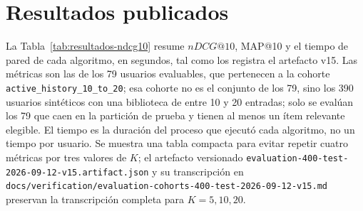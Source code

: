 \section{Resultados publicados}\label{sec:exp-resultados}\label{sec:exp-exito}

La Tabla~\ref{tab:resultados-ndcg10} resume \(nDCG@10\), MAP@10 y el tiempo de pared de cada algoritmo, en segundos, tal como los registra el artefacto v15. Las métricas son las de los 79 usuarios evaluables, que pertenecen a la cohorte \texttt{active\_history\_10\_to\_20}; esa cohorte no es el conjunto de los 79, sino los 390 usuarios sintéticos con una biblioteca de entre 10 y 20 entradas; solo se evalúan los 79 que caen en la partición de prueba y tienen al menos un ítem relevante elegible. El tiempo es la duración del proceso que ejecutó cada algoritmo, no un tiempo por usuario. Se muestra una tabla compacta para evitar repetir cuatro métricas por tres valores de \(K\); el artefacto versionado \texttt{evaluation-400-test-2026-09-12-v15.artifact.json} y su transcripción en \texttt{docs/verification/evaluation-cohorts-400-test-2026-09-12-v15.md} preservan la transcripción completa para \(K=5,10,20\).

